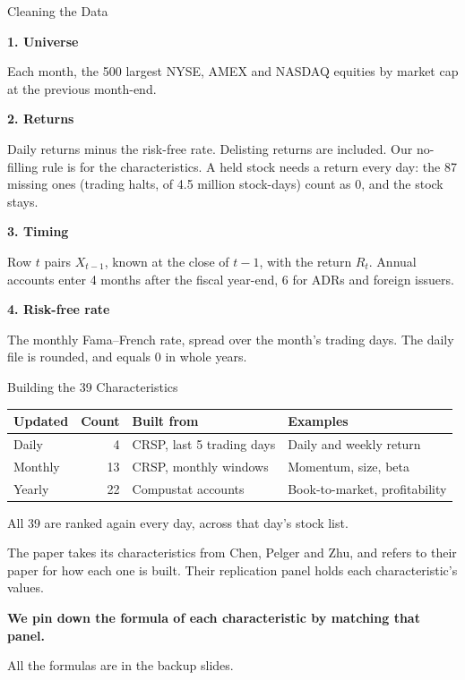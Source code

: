\documentclass[11pt]{beamer}
\newcommand{\claim}[1]{%
  \par{\color{SBred}\bfseries #1\par}
}
\begin{document}
\begin{frame}{Cleaning the Data}
\claim{1. Universe}\par
Each month, the 500 largest NYSE, AMEX and NASDAQ equities by market cap
at the previous month-end.

\smallskip
\claim{2. Returns}\par
Daily returns minus the risk-free rate. Delisting returns are included.
Our no-filling rule is for the characteristics. A held stock needs a return every day:
the 87 missing ones (trading halts, of 4.5 million stock-days) count as $0$, and the stock stays.

\smallskip
\claim{3. Timing}\par
Row $t$ pairs $X_{t-1}$, known at the close of $t-1$, with the return $R_t$.
Annual accounts enter 4 months after the fiscal year-end, 6 for ADRs and foreign issuers.

\smallskip
\claim{4. Risk-free rate}\par
The monthly Fama--French rate, spread over the month's trading days.
The daily file is rounded, and equals $0$ in whole years.
\end{frame}

\begin{frame}{Building the 39 Characteristics}
\begin{center}
\small
\begin{tabular}{@{}lrll@{}}
\toprule
Updated & Count & Built from & Examples\\
\midrule
Daily & 4 & CRSP, last 5 trading days & Daily and weekly return\\
Monthly & 13 & CRSP, monthly windows & Momentum, size, beta\\
Yearly & 22 & Compustat accounts & Book-to-market, profitability\\
\bottomrule
\end{tabular}
\end{center}
All 39 are ranked again every day, across that day's stock list.

\bigskip
The paper takes its characteristics from Chen, Pelger and Zhu, and refers to their paper for how
each one is built. Their replication panel holds each characteristic's values.
\claim{We pin down the formula of each characteristic by matching that panel.}

\bigskip
All the formulas are in the backup slides.
\end{frame}
\end{document}
